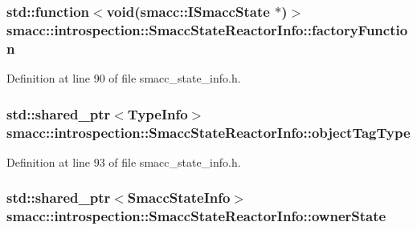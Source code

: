 \subsubsection[{\texorpdfstring{factory\+Function}{factoryFunction}}]{\setlength{\rightskip}{0pt plus 5cm}std\+::function$<$void({\bf smacc\+::\+I\+Smacc\+State} $\ast$)$>$ smacc\+::introspection\+::\+Smacc\+State\+Reactor\+Info\+::factory\+Function}\hypertarget{structsmacc_1_1introspection_1_1SmaccStateReactorInfo_a07d93f820f191aa3f9811fc2e1792b7a}{}\label{structsmacc_1_1introspection_1_1SmaccStateReactorInfo_a07d93f820f191aa3f9811fc2e1792b7a}


Definition at line 90 of file smacc\+\_\+state\+\_\+info.\+h.

\subsubsection[{\texorpdfstring{object\+Tag\+Type}{objectTagType}}]{\setlength{\rightskip}{0pt plus 5cm}std\+::shared\+\_\+ptr$<${\bf Type\+Info}$>$ smacc\+::introspection\+::\+Smacc\+State\+Reactor\+Info\+::object\+Tag\+Type}\hypertarget{structsmacc_1_1introspection_1_1SmaccStateReactorInfo_ae76d3acd0f68e75051ed002f10539738}{}\label{structsmacc_1_1introspection_1_1SmaccStateReactorInfo_ae76d3acd0f68e75051ed002f10539738}


Definition at line 93 of file smacc\+\_\+state\+\_\+info.\+h.

\subsubsection[{\texorpdfstring{owner\+State}{ownerState}}]{\setlength{\rightskip}{0pt plus 5cm}std\+::shared\+\_\+ptr$<${\bf Smacc\+State\+Info}$>$ smacc\+::introspection\+::\+Smacc\+State\+Reactor\+Info\+::owner\+State}\hypertarget{structsmacc_1_1introspection_1_1SmaccStateReactorInfo_a7f79a42095ce284939ca47fb25a14101}{}\label{structsmacc_1_1introspection_1_1SmaccStateReactorInfo_a7f79a42095ce284939ca47fb25a14101}


